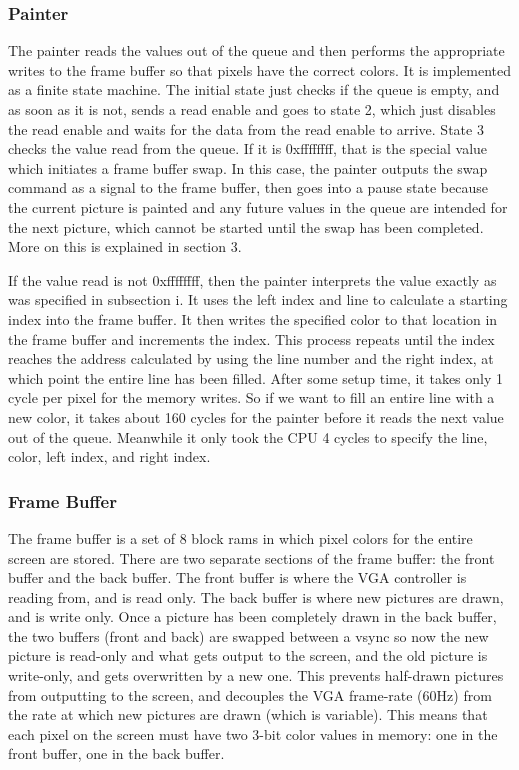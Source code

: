 \documentclass[onecolumn]{IEEEtran}
\begin{document}
\subsubsection{Painter}
The painter reads the values out of the queue and then performs the appropriate writes to the frame buffer so that pixels have the correct colors.  It is implemented as a finite state machine.  The initial state just checks if the queue is empty, and as soon as it is not, sends a read enable and goes to state 2, which just disables the read enable and waits for the data from the read enable to arrive.  State 3 checks the value read from the queue.  If it is 0xffffffff, that is the special value which initiates a frame buffer swap.  In this case, the painter outputs the swap command as a signal to the frame buffer, then goes into a pause state because the current picture is painted and any future values in the queue are intended for the next picture, which cannot be started until the swap has been completed.  More on this is explained in section 3.

If the value read is not 0xffffffff, then the painter interprets the value exactly as was specified in subsection i.  It uses the left index and line to calculate a starting index into the frame buffer.  It then writes the specified color to that location in the frame buffer and increments the index.  This process repeats until the index reaches the address calculated by using the line number and the right index, at which point the entire line has been filled.  After some setup time, it takes only 1 cycle per pixel for the memory writes.  So if we want to fill an entire line with a new color, it takes about 160 cycles for the painter before it reads the next value out of the queue.  Meanwhile it only took the CPU 4 cycles to specify the line, color, left index, and right index.

\subsubsection{Frame Buffer}
The frame buffer is a set of 8 block rams in which pixel colors for the entire screen are stored.  There are two separate sections of the frame buffer: the front buffer and the back buffer.  The front buffer is where the VGA controller is reading from, and is read only.  The back buffer is where new pictures are drawn, and is write only.  Once a picture has been completely drawn in the back buffer, the two buffers (front and back) are swapped between a vsync so now the new picture is read-only and what gets output to the screen, and the old picture is write-only, and gets overwritten by a new one.  This prevents half-drawn pictures from outputting to the screen, and decouples the VGA frame-rate (60Hz) from the rate at which new pictures are drawn (which is variable).  This means that each pixel on the screen must have two 3-bit color values in memory: one in the front buffer, one in the back buffer.  
\end{document}
